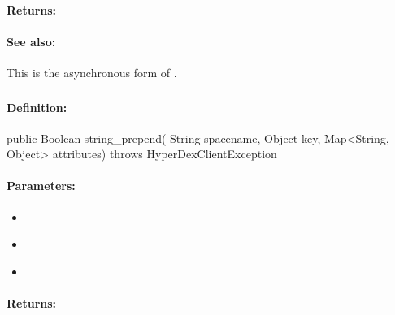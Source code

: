 \paragraph{Returns:}


\paragraph{See also:}  This is the asynchronous form of .

\pagebreak
\subsubsection{}
\label{api:java:string_prepend}


\paragraph{Definition:}
\begin{javacode}
public Boolean string_prepend(
        String spacename,
        Object key,
        Map<String, Object> attributes) throws HyperDexClientException
\end{javacode}

\paragraph{Parameters:}
\begin{itemize}[noitemsep]
\item {}\\

\item {}\\

\item {}\\

\end{itemize}

\paragraph{Returns:}


